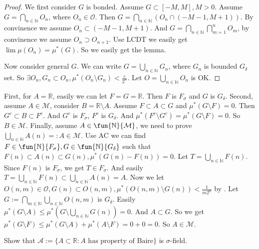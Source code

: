 \documentclass{ctexart}
\begin{document}
\begin{proof}
  We first consider \(G\) is bonded. Assume \(G \subset [-M,M],M >0\). Assume \(G =\bigcap_{n \in \mathbb{N}} O_n\), where \(O_n \in \mathcal{O}\). 
  Then \(G=\bigcap_{n \in \mathbb{N}} (O_n \cap (-M-1,M+1))\). By convinence we assume \(O_n \subset (-M-1,M+1)\). 
  And \(G=\bigcap_{n \in \mathbb{N}} \bigcap_{m=1}^n O_m \), by convinence we assume \(O_n \supset O_{n+1} \). 
  Use LCDT we easily get \(\lim \mu (O_n)=\mu^{*} (G)\). So we easily get the lemma. 

  Now consider general \(G\). We can write \(G = \bigcup_{n \in \mathbb{N}} G_n\), where \(G_n\) is bounded \(G_{\delta}\) set. 
  So \(\exists O_n,G_n \subset O_n,\mu^{*}(O_n\setminus G_n) <\frac{\varepsilon}{2^n}\). 
  Let \(O=\bigcup_{n \in \mathbb{N}} O_n\) is OK. 
\end{proof}
\begin{solution}
  First, for \(A=\mathbb{R}\), easily we can let \(F=G=\mathbb{R}\). Then \(F\) is \(F_{\sigma}\) and \(G\) is \(G_{\delta}\). 
  Second, assume \(A \in \mathcal{M}\), consider \(B=\mathbb{R}\setminus A\). 
  Assume \(F \subset A \subset G\) and \(\mu^{*}(G\setminus F)=0\). Then \(G^c \subset B \subset F^c\). 
  And \(G^c\) is \(F_{\sigma}\), \(F^c\) is \(G_{\delta}\). And \(\mu^{*}(F^c\setminus G^c)=\mu^{*}(G\setminus F)=0\). 
  So \(B \in \mathcal{M}\). 
  Finally, assume \(A \in \fun{\mathbb{N}}{\mathcal{M}}\), we need to prove \(\bigcup_{n \in \mathbb{N}} A(n) =:A\in \mathcal{M}\). 
  Use AC we can find \(F \in \fun{ \mathbb{N}}{F_{\sigma}},G \in \fun{ \mathbb{N}}{G_{\delta}}\) such that \(F(n)\subset A(n) \subset G(n),\mu^{*}(G(n)-F(n))=0\). 
  Let \(T=\bigcup_{n \in \mathbb{N}} F(n)\). Since \(F(n)\) is \(F_{\sigma}\), we get \(T \in F_{\sigma}\). 
  And easily \(T=\bigcup_{n \in \mathbb{N}} F(n) \subset \bigcup_{n \in \mathbb{N}} A(n)=A\). 
  Now we let \(O(n,m)\in \mathcal{O},G(n) \subset O(n,m),\mu^{*}(O(n,m)\setminus G(n)) <\frac{1}{m2^n}\) by . 
  Let \(G:= \bigcap_{m \in \mathbb{N}} \bigcup_{n \in \mathbb{N}} O(n,m)\) is \(G_\delta\). 
  Easily \(\mu^{*}(G \setminus A) \leq \mu^{*}(G \setminus \bigcup_{n \in \mathbb{N}} G(n))=0\). And \(A \subset G\). 
  So we get \(\mu^{*}(G\setminus F)\leq \mu^{*}(G\setminus A)+\mu^{*}(A \setminus F)=0+0=0\). 
  So \(A \in \mathcal{M}\). 
\end{solution}

\begin{problem}
  Show that \(\mathcal{A}:=\{A \subset \mathbb{R}:A \text{ has property of Baire}\}\) is \(\sigma\)-field. 
\end{problem}
\end{document}
